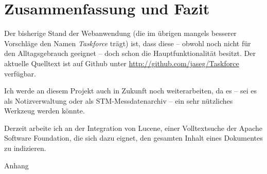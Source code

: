 \documentclass[12pt,ngerman,a4]{scrartcl}
\begin{document}
\section{Zusammenfassung und Fazit}
Der bisherige Stand der Webanwendung (die im übrigen mangels besserer Vorschläge den Namen \emph{Taskforce} trägt) ist, dass diese -- obwohl noch nicht für den Alltagsgebrauch geeignet -- doch schon die Hauptfunktionalität besitzt. Der aktuelle Quelltext ist auf Github unter \url{http://github.com/jaseg/Taskforce} verfügbar.

Ich werde an diesem Projekt auch in Zukunft noch weiterarbeiten, da es -- sei es als Notizverwaltung oder als STM-Messdatenarchiv -- ein sehr nützliches Werkzeug werden könnte.

Derzeit arbeite ich an der Integration von Lucene, einer Volltextsuche der Apache Software Foundation\cite{lucene}, die sich dazu eignet, den gesamten Inhalt eines Dokumentes zu indizieren.

\clearpage
\textsf{\huge Anhang}
\appendix
\end{document}
